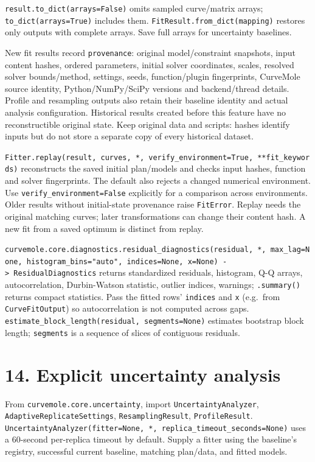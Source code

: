 \documentclass[
  10pt,
  a4paper,
  oneside]{scrreprt}
\begin{document}
\texttt{result.to\_dict(arrays=False)} omits sampled curve/matrix
arrays; \texttt{to\_dict(arrays=True)} includes them.
\texttt{FitResult.from\_dict(mapping)} restores only outputs with
complete arrays. Save full arrays for uncertainty baselines.

New fit results record \texttt{provenance}: original model/constraint
snapshots, input content hashes, ordered parameters, initial solver
coordinates, scales, resolved solver bounds/method, settings, seeds,
function/plugin fingerprints, CurveMole source identity,
Python/NumPy/SciPy versions and backend/thread details. Profile and
resampling outputs also retain their baseline identity and actual
analysis configuration. Historical results created before this feature
have no reconstructible original state. Keep original data and scripts:
hashes identify inputs but do not store a separate copy of every
historical dataset.

\texttt{Fitter.replay(result,\ curves,\ *,\ verify\_environment=True,\ **fit\_keywords)}
reconstructs the saved initial plan/models and checks input hashes,
function and solver fingerprints. The default also rejects a changed
numerical environment. Use \texttt{verify\_environment=False} explicitly
for a comparison across environments. Older results without
initial-state provenance raise \texttt{FitError}. Replay needs the
original matching curves; later transformations can change their content
hash. A new fit from a saved optimum is distinct from replay.

\texttt{curvemole.core.diagnostics.residual\_diagnostics(residual,\ *,\ max\_lag=None,\ histogram\_bins="auto",\ indices=None,\ x=None)\ -\textgreater{}\ ResidualDiagnostics}
returns standardized residuals, histogram, Q-Q arrays, autocorrelation,
Durbin-Watson statistic, outlier indices, warnings; \texttt{.summary()}
returns compact statistics. Pass the fitted rows' \texttt{indices} and
\texttt{x} (e.g.~from \texttt{CurveFitOutput}) so autocorrelation is not
computed across gaps.
\texttt{estimate\_block\_length(residual,\ segments=None)} estimates
bootstrap block length; \texttt{segments} is a sequence of slices of
contiguous residuals.

\hypertarget{explicit-uncertainty-analysis}{%
\section{14. Explicit uncertainty
analysis}\label{explicit-uncertainty-analysis}}

From \texttt{curvemole.core.uncertainty}, import
\texttt{UncertaintyAnalyzer}, \texttt{AdaptiveReplicateSettings},
\texttt{ResamplingResult}, \texttt{ProfileResult}.
\texttt{UncertaintyAnalyzer(fitter=None,\ *,\ replica\_timeout\_seconds=None)}
uses a 60-second per-replica timeout by default. Supply a fitter using
the baseline's registry, successful current baseline, matching
plan/data, and fitted models.
\end{document}
